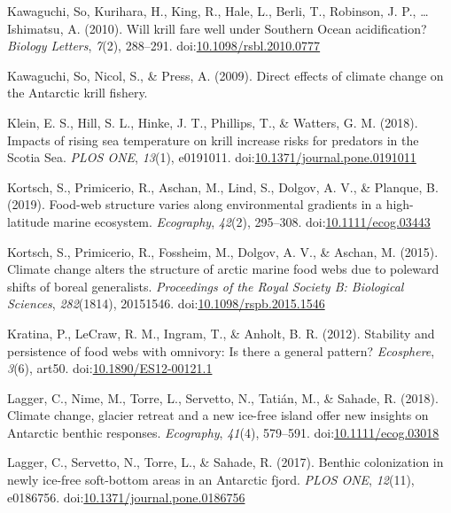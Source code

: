\documentclass[
]{article}
\newlength{\cslhangindent}
\newlength{\cslentryspacingunit} %
\newenvironment{CSLReferences}[2] %
 {%
  \setlength{\parindent}{0pt}
  \ifodd #1
  \let\oldpar\par
  \def\par{\hangindent=\cslhangindent\oldpar}
  \fi
  \setlength{\parskip}{#2\cslentryspacingunit}
 }%
 {}
\begin{document}
\begin{CSLReferences}{1}{0}
\leavevmode{}%
Kawaguchi, So, Kurihara, H., King, R., Hale, L., Berli, T., Robinson, J.
P., \ldots{} Ishimatsu, A. (2010). Will krill fare well under {Southern
Ocean} acidification? \emph{Biology Letters}, \emph{7}(2), 288--291.
doi:\href{https://doi.org/10.1098/rsbl.2010.0777}{10.1098/rsbl.2010.0777}

\leavevmode{}%
Kawaguchi, So, Nicol, S., \& Press, A. (2009). Direct effects of climate
change on the {Antarctic} krill fishery.

\leavevmode{}%
Klein, E. S., Hill, S. L., Hinke, J. T., Phillips, T., \& Watters, G. M.
(2018). Impacts of rising sea temperature on krill increase risks for
predators in the {Scotia Sea}. \emph{PLOS ONE}, \emph{13}(1), e0191011.
doi:\href{https://doi.org/10.1371/journal.pone.0191011}{10.1371/journal.pone.0191011}

\leavevmode{}%
Kortsch, S., Primicerio, R., Aschan, M., Lind, S., Dolgov, A. V., \&
Planque, B. (2019). Food-web structure varies along environmental
gradients in a high-latitude marine ecosystem. \emph{Ecography},
\emph{42}(2), 295--308.
doi:\href{https://doi.org/10.1111/ecog.03443}{10.1111/ecog.03443}

\leavevmode{}%
Kortsch, S., Primicerio, R., Fossheim, M., Dolgov, A. V., \& Aschan, M.
(2015). Climate change alters the structure of arctic marine food webs
due to poleward shifts of boreal generalists. \emph{Proceedings of the
Royal Society B: Biological Sciences}, \emph{282}(1814), 20151546.
doi:\href{https://doi.org/10.1098/rspb.2015.1546}{10.1098/rspb.2015.1546}

\leavevmode{}%
Kratina, P., LeCraw, R. M., Ingram, T., \& Anholt, B. R. (2012).
Stability and persistence of food webs with omnivory: {Is} there a
general pattern? \emph{Ecosphere}, \emph{3}(6), art50.
doi:\href{https://doi.org/10.1890/ES12-00121.1}{10.1890/ES12-00121.1}

\leavevmode{}%
Lagger, C., Nime, M., Torre, L., Servetto, N., Tatián, M., \& Sahade, R.
(2018). Climate change, glacier retreat and a new ice-free island offer
new insights on {Antarctic} benthic responses. \emph{Ecography},
\emph{41}(4), 579--591.
doi:\href{https://doi.org/10.1111/ecog.03018}{10.1111/ecog.03018}

\leavevmode{}%
Lagger, C., Servetto, N., Torre, L., \& Sahade, R. (2017). Benthic
colonization in newly ice-free soft-bottom areas in an {Antarctic}
fjord. \emph{PLOS ONE}, \emph{12}(11), e0186756.
doi:\href{https://doi.org/10.1371/journal.pone.0186756}{10.1371/journal.pone.0186756}


\end{CSLReferences}
\end{document}
